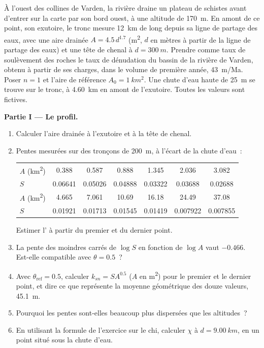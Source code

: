 \begin{problem}
\label{pb:b3:quantitative-geomorphology:1}
À l'ouest des collines de Varden, la rivière draine un plateau de schistes avant
d'entrer sur la carte par son bord ouest, à une altitude de \qty{170}{m}. En amont
de ce point, son exutoire, le tronc mesure \qty{12}{km} de long depuis sa ligne de partage des eaux,
avec une aire drainée $A = 4.5\,d^{1.7}$ (\unit{m^2}, $d$ en mètres à partir de la
ligne de partage des eaux) et une tête de chenal à $d = \qty{300}{m}$. Prendre comme taux de soulèvement des roches
le taux de dénudation du bassin de la rivière de Varden, obtenu à partir de ses
charges, dans le volume de première année, \qty{43}{m/Ma}. Poser $n = 1$ et l'aire de référence $A_0 = \qty{1}{km^2}$.
Une chute d'eau haute de \qty{25}{m} se trouve sur le tronc, à \qty{4.60}{km} en amont de
l'exutoire. Toutes les valeurs sont fictives.

\medskip\noindent\textbf{Partie I --- Le profil.}
\begin{enumerate}
\item Calculer l'aire drainée à l'exutoire et à la tête de chenal.
\item Pentes mesurées sur des tronçons de \qty{200}{m}, à l'écart de la
  chute d'eau~:

  \smallskip
  {\small\begin{tabular}{l*{6}{c}}
  $A$ (\unit{km^2}) & 0.388 & 0.587 & 0.888 & 1.345 & 2.036 & 3.082 \\
  $S$ & 0.06641 & 0.05026 & 0.04888 & 0.03322 & 0.03688 & 0.02688 \\[2pt]
  $A$ (\unit{km^2}) & 4.665 & 7.061 & 10.69 & 16.18 & 24.49 & 37.08 \\
  $S$ & 0.01921 & 0.01713 & 0.01545 & 0.01419 & 0.007922 & 0.007855
  \end{tabular}}

  \smallskip
  Estimer l' à partir du premier et du dernier point.
\item La pente des moindres carrés de $\log S$ en fonction de $\log A$ vaut $-0.466$.
  Est-elle compatible avec $\theta = 0.5$~?
\item Avec $\theta_{\mathrm{ref}} = 0.5$, calculer $k_{sn} = S A^{0.5}$ ($A$ en
  \unit{m^2}) pour le premier et le dernier point, et dire ce que
  représente la moyenne géométrique des douze valeurs, \qty{45.1}{m}.
\item Pourquoi les pentes sont-elles beaucoup plus dispersées que les altitudes~?
\item En utilisant la formule de l'exercice sur le chi, calculer $\chi$ à $d =
  \qty{9.00}{km}$, en un point situé sous la chute d'eau.
\end{enumerate}


\end{problem}

